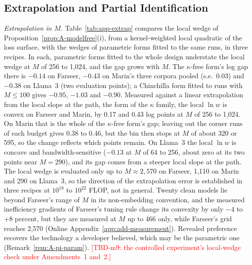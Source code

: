 

\subsection{Extrapolation and Partial Identification}\label{app:wedge-pi}

\textit{Extrapolation in $M$.} Table~\ref{tab:app-extrap} compares the local wedge of
Proposition~\ref{prop:A-modelfree}(i), from a kernel-weighted local quadratic of the loss surface, with the wedges of
parametric forms fitted to the same runs, in three recipes. In each, parametric forms fitted to the whole design understate
the local wedge at $M$ of 256 to 1,024, and the gap grows with $M$. The $\kappa$-free form's log gap there is $-0.14$ on
Farseer, $-0.43$ on Marin's three corpora pooled (s.e.\ 0.03) and $-0.38$ on Llama~3 (two evaluation points); a
Chinchilla form fitted to runs with $M\le100$ gives $-0.95$, $-1.03$ and $-0.90$. Measured against a linear extrapolation
from the local slope at the path, the form of the $\kappa$ family, the local $\ln w$ is convex on Farseer and Marin, by
0.17 and 0.43 log points at $M$ of 256 to 1,024. On Marin that is the whole of the $\kappa$-free form's gap; leaving out the
corner runs of each budget gives 0.38 to 0.46, but the bin then stops at $M$ of about 320 or 595, so the change reflects
which points remain. On Llama~3 the local $\ln w$ is concave and bandwidth-sensitive ($-0.13$ at $M$ of 64 to 256, about
zero at its two points near $M=290$), and its gap comes from a steeper local slope at the path. The local wedge is
evaluated only up to $M\approx2{,}570$ on Farseer, 1,110 on Marin and 290 on Llama~3, so the direction of the
extrapolation error is established in three recipes at $10^{18}$ to $10^{22}$ FLOP, not in general. Twenty clean models
lie beyond Farseer's range of $M$ in its non-embedding convention, and the measured inefficiency gradients of Farseer's
tuning rule change its convexity by only $-4$ to $+8$ percent, but they are measured at $M$ up to 466 only, while Farseer's
grid reaches 2,570 (Online Appendix~\ref{app:add-measurement}). Revealed preference recovers the technology a developer
believed, which may be the parametric one (Remark~\ref{rem:A-pi-param}). \textcolor{red}{[TBD-m9: the controlled
experiment's local-wedge check under Amendments~1 and~2.]}

